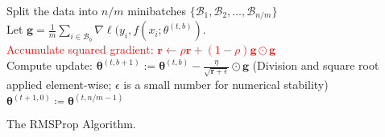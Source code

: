 \documentclass[12pt,a4paper]{article}
\begin{document}
\begin{algorithm}[H]


    {   
        Split the data into $n/m$ minibatches $\{\mathcal{B}_1, \mathcal{B}_2, \ldots, \mathcal{B}_{n/m}\}$\\
        {
            Let $\boldsymbol{g} = \frac{1}{m} \sum_{i \in \mathcal{B}_b} \nabla \ell(y_i, f(x_i; \theta^{(t, b)})$.\\
            \textcolor{red}{Accumulate squared gradient: $\boldsymbol{r} \leftarrow \rho \boldsymbol{r} + (1-\rho)\boldsymbol{g} \odot \boldsymbol{g}$}\\
            Compute update: $\boldsymbol{\theta}^{(t, b+1)} := \boldsymbol{\theta}^{(t, b)} - \frac{\eta}{\sqrt{\boldsymbol{r} + \epsilon}} \odot \boldsymbol{g}$ (Division and square root applied element-wise; $\epsilon$ is a small number for numerical stability)\\
        }
        $\boldsymbol{\theta}^{(t+1, 0)} \coloneqq \boldsymbol{\theta}^{(t, n/m-1)}$\\
    }

	\caption{The RMSProp Algorithm.}
\end{algorithm}
\end{document}
